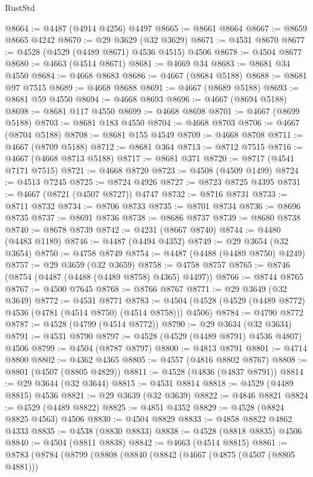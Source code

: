 \begin{lexlean}{RustStd}
\begin{coremodule}
@8664 := @4487 (@4914 @4256) @4497
@8665 := @8661 @8664
@8667 := @8659 @8665 @4242
@8670 := @29 @3629 (@32 @3629)
@8671 := @4531 @8670
@8677 := @4528 (@4529 (@4489 @8671) @4536 @4515) @4506
@8678 := @4504 @8677
@8680 := @4663 (@4514 @8671)
@8681 := @4669 @34
@8683 := @8681 @34 @4550
@8684 := @4668 @8683
@8686 := @4667 (@8684 @5188)
@8688 := @8681 @97 @7515
@8689 := @4668 @8688
@8691 := @4667 (@8689 @5188)
@8693 := @8681 @59 @4550
@8694 := @4668 @8693
@8696 := @4667 (@8694 @5188)
@8698 := @8681 @117 @4550
@8699 := @4668 @8698
@8701 := @4667 (@8699 @5188)
@8703 := @8681 @183 @4550
@8704 := @4668 @8703
@8706 := @4667 (@8704 @5188)
@8708 := @8681 @155 @4549
@8709 := @4668 @8708
@8711 := @4667 (@8709 @5188)
@8712 := @8681 @364
@8713 := @8712 @7515
@8716 := @4667 (@4668 @8713 @5188)
@8717 := @8681 @371
@8720 := @8717 (@4541 @7171 @7515)
@8721 := @4668 @8720
@8723 := @4508 (@4509 @1499)
@8724 := @4513 @7245
@8725 := @8724 @4926
@8727 := @8723 @8725 @4395
@8731 := @4667 (@8721 (@4507 @8727)) @4747
@8732 := @8716 @8731
@8733 := @8711 @8732
@8734 := @8706 @8733
@8735 := @8701 @8734
@8736 := @8696 @8735
@8737 := @8691 @8736
@8738 := @8686 @8737
@8739 := @8680 @8738
@8740 := @8678 @8739
@8742 := @4231 (@8667 @8740)
@8744 := @4480 (@4483 @1189)
@8746 := @4487 (@4494 @4352)
@8749 := @29 @3654 (@32 @3654)
@8750 := @4758 @8749
@8754 := @4487 (@4488 (@4489 @8750) @4249)
@8757 := @29 @3659 (@32 @3659)
@8758 := @4758 @8757
@8765 := @8746 (@8754 (@4487 (@4488 (@4489 @8758) @4365) @4497))
@8766 := @8744 @8765
@8767 := @4500 @7645
@8768 := @8766 @8767
@8771 := @29 @3649 (@32 @3649)
@8772 := @4531 @8771
@8783 := @4504 (@4528 (@4529 (@4489 @8772) @4536 (@4781 (@4514 @8750) (@4514 @8758))) @4506)
@8784 := @4790 @8772
@8787 := @4528 (@4799 (@4514 @8772))
@8790 := @29 @3634 (@32 @3634)
@8791 := @4531 @8790
@8797 := @4528 (@4529 (@4489 @8791) @4536 @4807) @4506
@8799 := @4504 (@8787 @8797)
@8800 := @4813 @8791
@8801 := @4714 @8800
@8802 := @4362 @4365
@8805 := @4557 (@4816 @8802 @8767)
@8808 := @8801 (@4507 (@8805 @4829))
@8811 := @4528 (@4836 (@4837 @8791))
@8814 := @29 @3644 (@32 @3644)
@8815 := @4531 @8814
@8818 := @4529 (@4489 @8815) @4536
@8821 := @29 @3639 (@32 @3639)
@8822 := @4846 @8821
@8824 := @4529 (@4489 @8822)
@8825 := @4851 @4352
@8829 := @4528 (@8824 @8825 @4563) @4506
@8830 := @4504 @8829
@8833 := @4858 @8822 @4862 @4333
@8835 := @4538 (@8830 @8833)
@8838 := @4528 (@8818 @8835) @4506
@8840 := @4504 (@8811 @8838)
@8842 := @4663 (@4514 @8815)
@8861 := @8783
    (@8784
      (@8799
        (@8808
          (@8840
            (@8842
              (@4667
                (@4875 (@4507 (@8805 @4881)))

\end{coremodule}
\end{lexlean}

